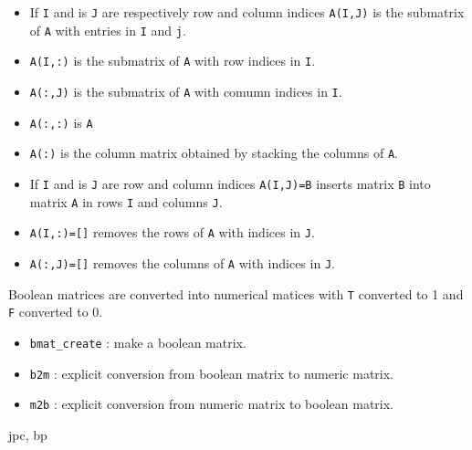 \begin{itemize}
   \item If \verb+I+ and is \verb+J+ are respectively row and column indices \verb+A(I,J)+ is the submatrix of \verb+A+ with entries in \verb+I+ and \verb+j+.
   \item \verb+A(I,:)+ is the submatrix of \verb+A+ with row indices in \verb+I+.
   \item \verb+A(:,J)+ is the submatrix of \verb+A+ with comumn indices in \verb+I+.
   \item \verb+A(:,:)+ is \verb+A+
   \item \verb+A(:)+  is the column matrix obtained by stacking the columns of \verb+A+.
\end{itemize}
\begin{itemize}
   \item If \verb+I+ and is \verb+J+ are row and column indices \verb+A(I,J)=B+ inserts
matrix \verb+B+ into matrix \verb+A+ in rows \verb+I+ and columns \verb!J!.
   \item \verb+A(I,:)=[]+ removes the rows of \verb+A+ with indices in \verb+J+.
   \item \verb+A(:,J)=[]+ removes the columns of \verb+A+ with indices in \verb+J+.
\end{itemize}

Boolean matrices are converted into numerical matices with \verb+T+ converted to 1 
and \verb+F+ converted to 0. 
\begin{itemize}
\item \verb+bmat_create+ : make a boolean matrix.
\item \verb+b2m+ : explicit conversion from boolean matrix to numeric matrix.
\item \verb+m2b+ : explicit conversion from numeric matrix to boolean matrix.
\end{itemize}
\begin{manseealso}

\end{manseealso}

\begin{authors}
   jpc, bp
\end{authors}
